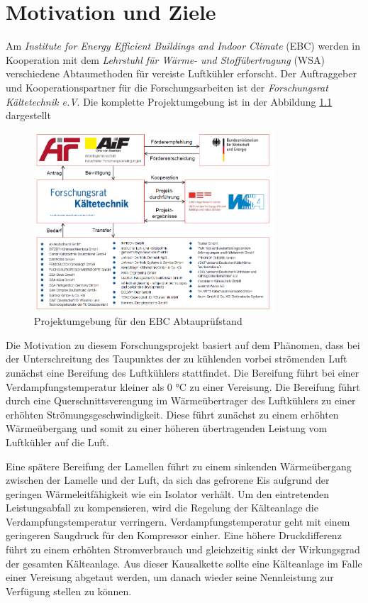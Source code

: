 \chapter{Motivation und Ziele}
\label{cha:Motivation_und_Ziele}

Am \textit{Institute for Energy Efficient Buildings and Indoor Climate }(EBC) werden in Kooperation mit dem \textit{Lehrstuhl für Wärme- und Stoffübertragung }(WSA) verschiedene Abtaumethoden für vereiste Luftkühler erforscht. Der Auftraggeber und Kooperationspartner für die Forschungsarbeiten ist der \textit{Forschungsrat Kältetechnik e.V}. Die komplette Projektumgebung ist in der Abbildung \ref{fig:Projektumgebung} dargestellt

\begin{figure}[htb]
	\centering
		\includegraphics[width=0.80\textwidth]{Pictures/Projektumgebung.png}
	\caption{Projektumgebung für den EBC Abtauprüfstand \citep{Freitag2015}}
	\label{fig:Projektumgebung}
\end{figure}

Die Motivation zu diesem Forschungsprojekt basiert auf dem Phänomen, dass bei der Unterschreitung des Taupunktes der zu kühlenden vorbei strömenden Luft zunächst eine Bereifung des Luftkühlers stattfindet. Die Bereifung führt bei einer Verdampfungstemperatur kleiner als 0 °C zu einer Vereisung. Die Bereifung führt durch eine Querschnittsverengung im Wärmeübertrager des Luftkühlers zu einer erhöhten Strömungsgeschwindigkeit. Diese führt zunächst zu einem erhöhten Wärmeübergang und somit zu einer höheren übertragenden Leistung vom Luftkühler auf die Luft.\citep{Schydlo2010}

Eine spätere Bereifung der Lamellen führt zu einem sinkenden Wärmeübergang zwischen der Lamelle und der Luft, da sich das gefrorene Eis aufgrund der geringen Wärmeleitfähigkeit wie ein Isolator verhält. Um den eintretenden Leistungsabfall zu kompensieren, wird die Regelung der Kälteanlage die Verdampfungstemperatur verringern. Verdampfungstemperatur geht mit einem geringeren Saugdruck für den Kompressor einher. Eine höhere Druckdifferenz führt zu einem erhöhten Stromverbrauch und gleichzeitig sinkt der Wirkungsgrad der gesamten Kälteanlage.
Aus dieser Kausalkette sollte eine Kälteanlage im Falle einer Vereisung abgetaut werden, um danach wieder seine Nennleistung zur Verfügung stellen zu können.

